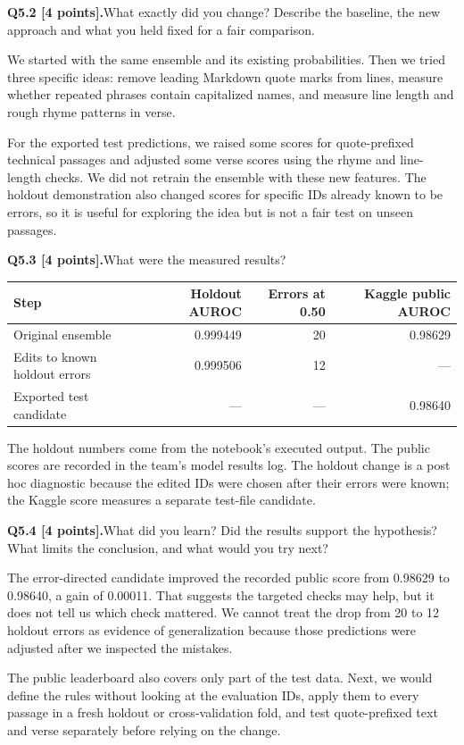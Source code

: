 \documentclass[11pt,letterpaper]{article}
\newcommand{\question}[2]{\needspace{4\baselineskip}\par\addvspace{0.45em}\noindent\textbf{#1}\quad #2\par\nobreak\vspace{0.1em}}
\begin{document}
\question{Q5.2 [4 points].}{What exactly did you change? Describe the baseline, the new approach and what you held fixed for a fair comparison.}
We started with the same ensemble and its existing probabilities. Then we tried three specific ideas: remove leading Markdown quote marks from lines, measure whether repeated phrases contain capitalized names, and measure line length and rough rhyme patterns in verse.
\newline

For the exported test predictions, we raised some scores for quote-prefixed technical passages and adjusted some verse scores using the rhyme and line-length checks. We did not retrain the ensemble with these new features. The holdout demonstration also changed scores for specific IDs already known to be errors, so it is useful for exploring the idea but is not a fair test on unseen passages.

\question{Q5.3 [4 points].}{What were the measured results?}
\begin{tabularx}{\linewidth}{@{}Yrrr@{}}\toprule
Step & Holdout AUROC & Errors at 0.50 & Kaggle public AUROC \\ \midrule
Original ensemble & 0.999449 & 20 & 0.98629 \\
Edits to known holdout errors & 0.999506 & 12 & --- \\
Exported test candidate & --- & --- & 0.98640 \\
\bottomrule\end{tabularx}

The holdout numbers come from the notebook's executed output. The public scores are recorded in the team's model results log. The holdout change is a post hoc diagnostic because the edited IDs were chosen after their errors were known; the Kaggle score measures a separate test-file candidate.

\question{Q5.4 [4 points].}{What did you learn? Did the results support the hypothesis? What limits the conclusion, and what would you try next?}
The error-directed candidate improved the recorded public score from 0.98629 to 0.98640, a gain of 0.00011. That suggests the targeted checks may help, but it does not tell us which check mattered. We cannot treat the drop from 20 to 12 holdout errors as evidence of generalization because those predictions were adjusted after we inspected the mistakes.
\newline

The public leaderboard also covers only part of the test data. Next, we would define the rules without looking at the evaluation IDs, apply them to every passage in a fresh holdout or cross-validation fold, and test quote-prefixed text and verse separately before relying on the change.
\end{document}
